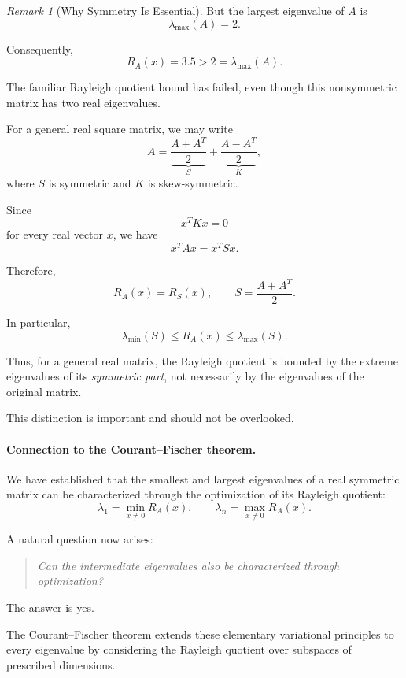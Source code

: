 \documentclass[14pt,letterpaper]{article}
\theoremstyle{plain}
\theoremstyle{definition}
\theoremstyle{remark}
\newtheorem{remark}[theorem]{Remark}
\begin{document}
\begin{remark}[Why Symmetry Is Essential]
But the largest eigenvalue of $A$ is
\[
\lambda_{\max}(A)=2.
\]

Consequently,
\[
\boxed{
R_A(x)=3.5>2=\lambda_{\max}(A).
}
\]

The familiar Rayleigh quotient
bound has failed, even though
this nonsymmetric matrix has
two real eigenvalues.

For a general real square matrix,
we may write
\[
A=
\underbrace{\frac{A+A^T}{2}}_{S}
+
\underbrace{\frac{A-A^T}{2}}_{K},
\]
where $S$ is symmetric and
$K$ is skew-symmetric.

Since
\[
x^TKx=0
\]
for every real vector $x$, we have
\[
x^TAx=x^TSx.
\]

Therefore,
\[
\boxed{
R_A(x)=R_S(x),
\qquad
S=\frac{A+A^T}{2}.
}
\]

In particular,
\[
\boxed{
\lambda_{\min}(S)
\leq R_A(x)\leq
\lambda_{\max}(S).
}
\]

Thus, for a general real matrix,
the Rayleigh quotient is bounded
by the extreme eigenvalues of
its \emph{symmetric part},
not necessarily by the
eigenvalues of the original matrix.

This distinction is important
and should not be overlooked.

\end{remark}


\paragraph{Connection to the Courant--Fischer theorem.}

We have established that the smallest
and largest eigenvalues of a real
symmetric matrix can be characterized
through the optimization of its
Rayleigh quotient:
\[
\boxed{
\lambda_1=\min_{x\neq0}R_A(x),
\qquad
\lambda_n=\max_{x\neq0}R_A(x).
}
\]

A natural question now arises:

\begin{quote}
\emph{
Can the intermediate eigenvalues
also be characterized through
optimization?
}
\end{quote}

The answer is yes.

The Courant--Fischer theorem extends
these elementary variational principles
to every eigenvalue by considering
the Rayleigh quotient over subspaces
of prescribed dimensions.
\end{document}
